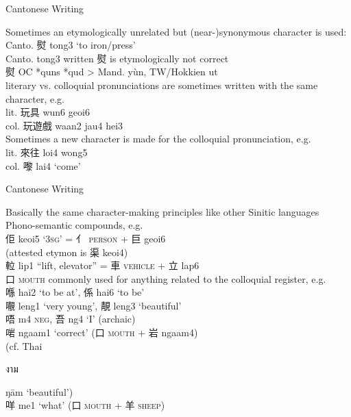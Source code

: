 \documentclass{beamer}
\begin{document}
\begin{frame}[fragile]{Cantonese Writing}

Sometimes an etymologically unrelated but (near-)synonymous character is used:\\
Canto. 熨 tong3 \enquote*{to iron/press}\\ 
Canto. tong3 written 熨 is etymologically not correct\\
熨 OC *quns *qud > Mand. yùn, TW/Hokkien ut\\

\bigskip
literary vs. colloquial pronunciations are sometimes written with the same character, e.g.\\
lit. 玩具 wun6 geoi6\\
col. 玩遊戲 waan2 jau4 hei3\\
\medskip
Sometimes a new character is made for the colloquial pronunciation, e.g.\\
lit. 來往 loi4 wong5\\
col. 嚟 lai4 \enquote*{come}\\

\end{frame}

\begin{frame}[fragile]{Cantonese Writing}

Basically the same character-making principles like other Sinitic languages\\

Phono-semantic compounds, e.g.\\
佢 keoi5 \enquote*{\textsc{3sg}} = 亻 \textsc{person} + 巨 geoi6\\ \quad (attested etymon is 渠 keoi4)\\
𨋢 lip1 \enquote{lift, elevator} = 車 \textsc{vehicle} + 立 lap6\\ 

\bigskip
口 \textsc{mouth} commonly used for anything related to the colloquial register, e.g.\\
喺 hai2 \enquote*{to be at}, 係 hai6 \enquote*{to be}\\
𡃁 leng1 \enquote*{very young}, 靚 leng3 \enquote*{beautiful} \\
唔 m4 \textsc{neg}, 吾 ng4 \enquote*{I} (archaic)\\
啱 ngaam1 \enquote*{correct} (口 \textsc{mouth} + 岩 ngaam4)\\ \quad (cf. Thai \begin{thai}งาม\end{thai} ŋām \enquote*{beautiful})\\
咩 me1 \enquote*{what} (口 \textsc{mouth} + 羊 \textsc{sheep})
\end{frame}
\end{document}
